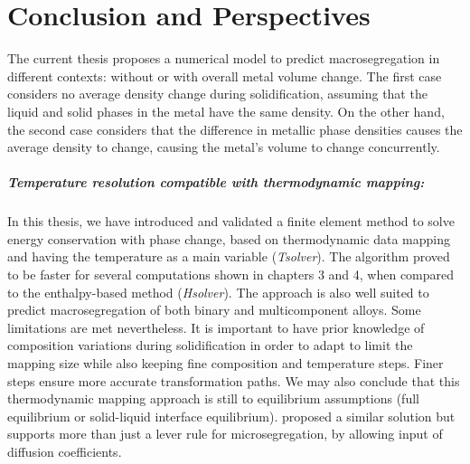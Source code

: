 \chapter*{Conclusion and Perspectives}


The current thesis proposes a numerical model to predict macrosegregation in different contexts: without or
with overall metal volume change. The first case considers no average density change during solidification, 
assuming that the liquid and solid phases in the metal have the same density. 
On the other hand, the second case considers that the difference in metallic phase densities causes the average density to change, causing the metal's volume to
change concurrently. 

\paragraph{Temperature resolution compatible with thermodynamic mapping:}
In this thesis, we have introduced and validated a finite element method to solve energy conservation with phase change, based 
on thermodynamic data mapping and having the temperature as a main variable (\emph{Tsolver}). The algorithm proved to be faster for several computations
shown in chapters 3 and 4, when compared to the enthalpy-based method (\emph{Hsolver}). The approach is also well suited to predict macrosegregation
of both binary and multicomponent alloys. Some limitations are met nevertheless. It is important to have prior knowledge of composition variations
during solidification in order to adapt to limit the mapping size while also keeping fine composition and temperature steps.
Finer steps ensure more accurate transformation paths. We may also conclude that this thermodynamic mapping approach is still
to equilibrium assumptions (full equilibrium or solid-liquid interface equilibrium). \citet{tourret_multiple_2011} proposed
a similar solution but supports more than just a lever rule for microsegregation, by allowing input of diffusion coefficients.


